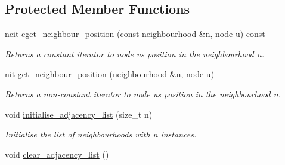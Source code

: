 \subsection*{Protected Member Functions}
\begin{DoxyCompactItemize}
\item 
\hyperlink{namespacelgraph_1_1utils_a7207b078932845778282f5e2e373575b}{ncit} \hyperlink{classlgraph_1_1utils_1_1xxgraph_af72476b0919eacd6e9b044f7c5528c1e}{cget\+\_\+neighbour\+\_\+position} (const \hyperlink{namespacelgraph_1_1utils_ac52fa2c52f47820841e83a3da5d308bc}{neighbourhood} \&n, \hyperlink{namespacelgraph_1_1utils_ab9c6b34241f0b68372c55f34c460e863}{node} u) const 
\begin{DoxyCompactList}\small\item\em Returns a constant iterator to node {\itshape u\textquotesingle{}s} position in the neighbourhood {\itshape n}. \end{DoxyCompactList}\item 
\hyperlink{namespacelgraph_1_1utils_af5daf6fe356a9014746bdb507787ae01}{nit} \hyperlink{classlgraph_1_1utils_1_1xxgraph_ab2ac2eb4cdc6c369cde7c71a1c3b8858}{get\+\_\+neighbour\+\_\+position} (\hyperlink{namespacelgraph_1_1utils_ac52fa2c52f47820841e83a3da5d308bc}{neighbourhood} \&n, \hyperlink{namespacelgraph_1_1utils_ab9c6b34241f0b68372c55f34c460e863}{node} u)
\begin{DoxyCompactList}\small\item\em Returns a non-\/constant iterator to node {\itshape u\textquotesingle{}s} position in the neighbourhood {\itshape n}. \end{DoxyCompactList}\item 
void \hyperlink{classlgraph_1_1utils_1_1xxgraph_a2201aaff5e9ffa29a9b3abfde705dd46}{initialise\+\_\+adjacency\+\_\+list} (size\+\_\+t n)\hypertarget{classlgraph_1_1utils_1_1xxgraph_a2201aaff5e9ffa29a9b3abfde705dd46}{}\label{classlgraph_1_1utils_1_1xxgraph_a2201aaff5e9ffa29a9b3abfde705dd46}

\begin{DoxyCompactList}\small\item\em Initialise the list of neighbourhoods with {\itshape n} instances. \end{DoxyCompactList}\item 
void \hyperlink{classlgraph_1_1utils_1_1xxgraph_a6523402d0ec66918b95de23d2bee38fc}{clear\+\_\+adjacency\+\_\+list} ()\hypertarget{classlgraph_1_1utils_1_1xxgraph_a6523402d0ec66918b95de23d2bee38fc}{}\label{classlgraph_1_1utils_1_1xxgraph_a6523402d0ec66918b95de23d2bee38fc}


\end{DoxyCompactItemize}
